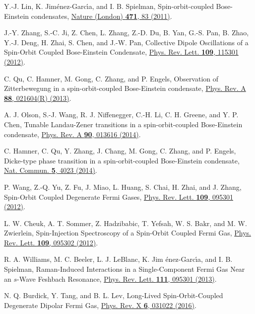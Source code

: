 \documentclass[twocolumn,prl,floatfix,citeautoscript,nofootinbib]{revtex4}
\begin{document}
\begin{thebibliography}{99}
 Y.-J. Lin, K. Jim\'{e}nez-Garc\'{\i}a, and I. B. Spielman,
{Spin-orbit-coupled Bose-Einstein condensates}, \href{http://dx.doi.org/10.1038/nature09887}%
{Nature (London) \textbf{471}, 83 (2011)}.

 J.-Y. Zhang, S.-C. Ji, Z. Chen, L. Zhang, Z.-D. Du, B.
Yan, G.-S. Pan, B. Zhao, Y.-J. Deng, H. Zhai, S. Chen, and J.-W. Pan, {%
Collective Dipole Oscillations of a Spin-Orbit Coupled Bose-Einstein
Condensate}, \href{http://dx.doi.org/10.1103/PhysRevLett.109.115301}{Phys.
Rev. Lett. \textbf{109}, 115301 (2012)}.

 C. Qu, C. Hamner, M. Gong, C. Zhang, and P. Engels, {%
Observation of Zitterbewegung in a spin-orbit-coupled Bose-Einstein
condensate}, \href{http://dx.doi.org/10.1103/PhysRevA.88.021604}{Phys. Rev.
A \textbf{88}, 021604(R) (2013)}.

 A. J. Olson, S.-J. Wang, R. J. Niffenegger, C.-H. Li, C.
H. Greene, and Y. P. Chen, {Tunable Landau-Zener transitions in a
spin-orbit-coupled Bose-Einstein condensate}, \href{http://dx.doi.org/10.1103/PhysRevA.90.013616}%
{Phys. Rev. A \textbf{90}, 013616 (2014)}.

 C. Hamner, C. Qu, Y. Zhang, J. Chang, M. Gong, C.
Zhang, and P. Engels, {Dicke-type phase transition in a spin-orbit-coupled
Bose-Einstein condensate}, \href{http://dx.doi.org/10.1038/ncomms5023}{Nat.
Commun. \textbf{5}, 4023 (2014)}.

 P. Wang, Z.-Q. Yu, Z. Fu, J. Miao, L. Huang, S. Chai, H.
Zhai, and J. Zhang, {Spin-Orbit Coupled Degenerate Fermi Gases}, \href{http://dx.doi.org/10.1103/PhysRevLett.109.095301}%
{Phys. Rev. Lett. \textbf{109}, 095301 (2012)}.

 L. W. Cheuk, A. T. Sommer, Z. Hadzibabic, T. Yefsah, W.
S. Bakr, and M. W. Zwierlein, {Spin-Injection Spectroscopy of a Spin-Orbit
Coupled Fermi Gas}, \href{http://dx.doi.org/10.1103/PhysRevLett.109.095302}{%
Phys. Rev. Lett. \textbf{109}, 095302 (2012)}.

 R. A. Williams, M. C. Beeler, L. J. LeBlanc, K. Jim%
\'{e}nez-Garc\'{\i}a, and I. B. Spielman, {Raman-Induced Interactions in a
Single-Component Fermi Gas Near an $s$-Wave Feshbach Resonance}, \href{http://dx.doi.org/10.1103/PhysRevLett.111.095301}%
{Phys. Rev. Lett. \textbf{111}, 095301 (2013)}.

 N. Q. Burdick, Y. Tang, and B. L. Lev, {Long-Lived
Spin-Orbit-Coupled Degenerate Dipolar Fermi Gas}, \href{https://doi.org/10.1103/PhysRevX.6.031022}%
{Phys. Rev. X \textbf{6}, 031022 (2016)}.


\end{thebibliography}
\end{document}
